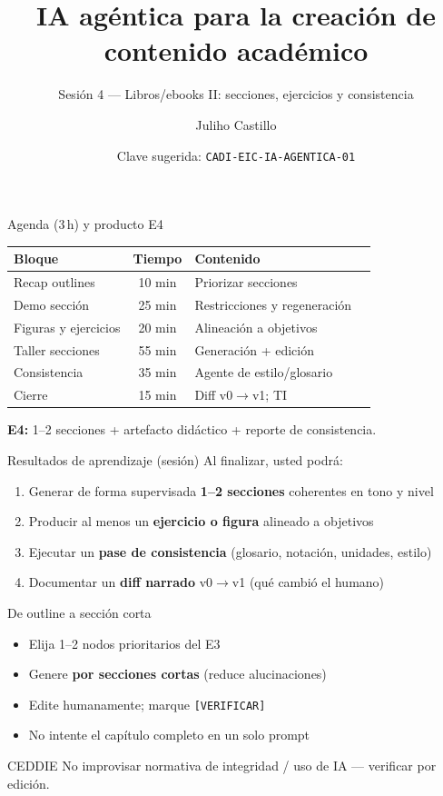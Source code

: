 \documentclass[aspectratio=169,11pt]{beamer}
\title{IA agéntica para la creación de contenido académico}
\subtitle{Sesión 4 --- Libros/ebooks II: secciones, ejercicios y consistencia}
\author{Juliho Castillo}
\institute{CADi 40\,h · Escuela de Ingeniería y Ciencias\\
Tecnológico de Monterrey}
\date{Clave sugerida: \texttt{CADI-EIC-IA-AGENTICA-01}}
\begin{document}
\begin{frame}
\titlepage
\end{frame}

\begin{frame}{Agenda (3\,h) y producto E4}
\begin{tabularx}{\textwidth}{@{}lclX@{}}
\toprule
Bloque & Tiempo & Contenido \\
\midrule
Recap outlines & 10 min & Priorizar secciones \\
Demo sección & 25 min & Restricciones y regeneración \\
Figuras y ejercicios & 20 min & Alineación a objetivos \\
Taller secciones & 55 min & Generación + edición \\
Consistencia & 35 min & Agente de estilo/glosario \\
Cierre & 15 min & Diff v0$\rightarrow$v1; TI \\
\bottomrule
\end{tabularx}
\vspace{0.5em}
\textbf{E4:} 1--2 secciones + artefacto didáctico + reporte de consistencia.
\end{frame}

\begin{frame}{Resultados de aprendizaje (sesión)}
Al finalizar, usted podrá:
\begin{enumerate}
\item Generar de forma supervisada \textbf{1--2 secciones} coherentes en tono y nivel
\item Producir al menos un \textbf{ejercicio o figura} alineado a objetivos
\item Ejecutar un \textbf{pase de consistencia} (glosario, notación, unidades, estilo)
\item Documentar un \textbf{diff narrado} v0$\rightarrow$v1 (qué cambió el humano)
\end{enumerate}
\end{frame}

\begin{frame}{De outline a sección corta}
\begin{itemize}
\item Elija 1--2 nodos prioritarios del E3
\item Genere \textbf{por secciones cortas} (reduce alucinaciones)
\item Edite humanamente; marque \texttt{[VERIFICAR]}
\item No intente el capítulo completo en un solo prompt
\end{itemize}
\begin{block}{CEDDIE}
No improvisar normativa de integridad / uso de IA --- verificar por edición.
\end{block}
\end{frame}
\end{document}
